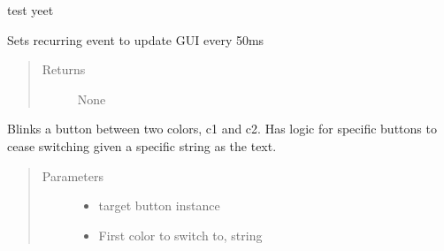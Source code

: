 \documentclass[letterpaper,10pt,english]{sphinxmanual}
\begin{document}

\begin{fulllineitems}
\label{\detokenize{index:droogCNC.TwoAxisStage}}
\sphinxAtStartPar
test yeet

\begin{fulllineitems}
\label{\detokenize{index:droogCNC.TwoAxisStage.Refresh}}
\sphinxAtStartPar
Sets recurring event to update GUI every 50ms
\begin{quote}\begin{description}
\item[{Returns}] \leavevmode
\sphinxAtStartPar
None

\end{description}\end{quote}

\end{fulllineitems}


\begin{fulllineitems}
\label{\detokenize{index:droogCNC.TwoAxisStage.__blinkButton}}
\sphinxAtStartPar
Blinks a button between two colors, c1 and c2. Has logic for specific buttons to cease switching given a
specific string as the text.
\begin{quote}\begin{description}
\item[{Parameters}] \leavevmode\begin{itemize}
\item {} 
\sphinxAtStartPar
{} \textendash{} target button instance

\item {} 
\sphinxAtStartPar
{} \textendash{} First color to switch to, string


\end{itemize}
\end{description}
\end{quote}
\end{fulllineitems}
\end{fulllineitems}
\end{document}

